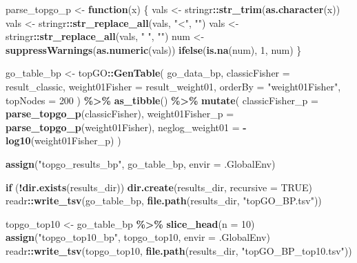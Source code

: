 \documentclass[
]{article}
\newenvironment{Shaded}{\begin{snugshade}}{\end{snugshade}}
\newcommand{\AttributeTok}[1]{\textcolor[rgb]{0.13,0.29,0.53}{#1}}
\newcommand{\ConstantTok}[1]{\textcolor[rgb]{0.56,0.35,0.01}{#1}}
\newcommand{\ControlFlowTok}[1]{\textcolor[rgb]{0.13,0.29,0.53}{\textbf{#1}}}
\newcommand{\DecValTok}[1]{\textcolor[rgb]{0.00,0.00,0.81}{#1}}
\newcommand{\FunctionTok}[1]{\textcolor[rgb]{0.13,0.29,0.53}{\textbf{#1}}}
\newcommand{\NormalTok}[1]{#1}
\newcommand{\OtherTok}[1]{\textcolor[rgb]{0.56,0.35,0.01}{#1}}
\newcommand{\SpecialCharTok}[1]{\textcolor[rgb]{0.81,0.36,0.00}{\textbf{#1}}}
\newcommand{\StringTok}[1]{\textcolor[rgb]{0.31,0.60,0.02}{#1}}
\begin{document}
\begin{Shaded}
\begin{Highlighting}[]
\NormalTok{parse\_topgo\_p }\OtherTok{\textless{}{-}} \ControlFlowTok{function}\NormalTok{(x) \{}
\NormalTok{  vals }\OtherTok{\textless{}{-}}\NormalTok{ stringr}\SpecialCharTok{::}\FunctionTok{str\_trim}\NormalTok{(}\FunctionTok{as.character}\NormalTok{(x))}
\NormalTok{  vals }\OtherTok{\textless{}{-}}\NormalTok{ stringr}\SpecialCharTok{::}\FunctionTok{str\_replace\_all}\NormalTok{(vals, }\StringTok{"\textless{}"}\NormalTok{, }\StringTok{""}\NormalTok{)}
\NormalTok{  vals }\OtherTok{\textless{}{-}}\NormalTok{ stringr}\SpecialCharTok{::}\FunctionTok{str\_replace\_all}\NormalTok{(vals, }\StringTok{" "}\NormalTok{, }\StringTok{""}\NormalTok{)}
\NormalTok{  num }\OtherTok{\textless{}{-}} \FunctionTok{suppressWarnings}\NormalTok{(}\FunctionTok{as.numeric}\NormalTok{(vals))}
  \FunctionTok{ifelse}\NormalTok{(}\FunctionTok{is.na}\NormalTok{(num), }\DecValTok{1}\NormalTok{, num)}
\NormalTok{\}}

\NormalTok{go\_table\_bp }\OtherTok{\textless{}{-}}\NormalTok{ topGO}\SpecialCharTok{::}\FunctionTok{GenTable}\NormalTok{(}
\NormalTok{  go\_data\_bp,}
  \AttributeTok{classicFisher =}\NormalTok{ result\_classic,}
  \AttributeTok{weight01Fisher =}\NormalTok{ result\_weight01,}
  \AttributeTok{orderBy =} \StringTok{"weight01Fisher"}\NormalTok{,}
  \AttributeTok{topNodes =} \DecValTok{200}
\NormalTok{) }\SpecialCharTok{\%\textgreater{}\%}
  \FunctionTok{as\_tibble}\NormalTok{() }\SpecialCharTok{\%\textgreater{}\%}
  \FunctionTok{mutate}\NormalTok{(}
    \AttributeTok{classicFisher\_p =} \FunctionTok{parse\_topgo\_p}\NormalTok{(classicFisher),}
    \AttributeTok{weight01Fisher\_p =} \FunctionTok{parse\_topgo\_p}\NormalTok{(weight01Fisher),}
    \AttributeTok{neglog\_weight01 =} \SpecialCharTok{{-}}\FunctionTok{log10}\NormalTok{(weight01Fisher\_p)}
\NormalTok{  )}

\FunctionTok{assign}\NormalTok{(}\StringTok{"topgo\_results\_bp"}\NormalTok{, go\_table\_bp, }\AttributeTok{envir =}\NormalTok{ .GlobalEnv)}

\ControlFlowTok{if}\NormalTok{ (}\SpecialCharTok{!}\FunctionTok{dir.exists}\NormalTok{(results\_dir)) }\FunctionTok{dir.create}\NormalTok{(results\_dir, }\AttributeTok{recursive =} \ConstantTok{TRUE}\NormalTok{)}
\NormalTok{readr}\SpecialCharTok{::}\FunctionTok{write\_tsv}\NormalTok{(go\_table\_bp, }\FunctionTok{file.path}\NormalTok{(results\_dir, }\StringTok{"topGO\_BP.tsv"}\NormalTok{))}

\NormalTok{topgo\_top10 }\OtherTok{\textless{}{-}}\NormalTok{ go\_table\_bp }\SpecialCharTok{\%\textgreater{}\%} \FunctionTok{slice\_head}\NormalTok{(}\AttributeTok{n =} \DecValTok{10}\NormalTok{)}
\FunctionTok{assign}\NormalTok{(}\StringTok{"topgo\_top10\_bp"}\NormalTok{, topgo\_top10, }\AttributeTok{envir =}\NormalTok{ .GlobalEnv)}
\NormalTok{readr}\SpecialCharTok{::}\FunctionTok{write\_tsv}\NormalTok{(topgo\_top10, }\FunctionTok{file.path}\NormalTok{(results\_dir, }\StringTok{"topGO\_BP\_top10.tsv"}\NormalTok{))}


\end{Highlighting}
\end{Shaded}
\end{document}
